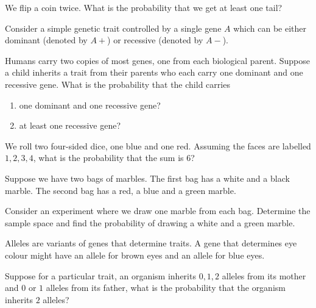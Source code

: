 \documentclass[../main.tex]{subfiles}
\begin{document}
\begin{example} \label{ex:probability-two-coins}
  We flip a coin twice.  What is the probability that we get at least one tail?

\end{example}

\begin{example} \label{ex:probability-genetics}
  Consider a simple genetic trait controlled by a single gene \(A\) which can be either dominant (denoted by \(A+\)) or recessive (denoted by \(A-\)).

  Humans carry two copies of most genes, one from each biological parent. Suppose a child inherits a trait from their parents who each carry  one dominant and one recessive gene. What is the probability that the child carries
  \begin{enumerate}
    \item one dominant and one recessive gene?
    \item at least one recessive gene?
  \end{enumerate}

  \blanks*
\end{example}
\clearpage

\begin{exercise} \label{ex:probability-two-dice-sum}
  We roll two four-sided dice, one blue and one red.  Assuming the faces are labelled \(1,2,3,4\), what is the probability that the sum is \(6\)?

\end{exercise}

\begin{exercise} \label{ex:probability-two-bags}
  Suppose we have two bags of marbles.  The first bag has a white and a black marble.  The second bag has a red, a blue and a green marble.

  Consider an experiment where we draw one marble from each bag.  Determine the sample space and find the probability of drawing a white and a green marble. 

\end{exercise}

\begin{exercise} \label{ex:probability-alleles}
  Alleles are variants of genes that determine traits.  A gene that determines  eye colour might have an allele for brown eyes and an allele for blue eyes.

  Suppose for a particular trait, an organism inherits \(0,1,2\) alleles  from its mother and \(0\) or \(1\) alleles from its father, what is the probability that the organism inherits \(2\) alleles?

  \blanks*
\end{exercise}
\clearpage
\end{document}
